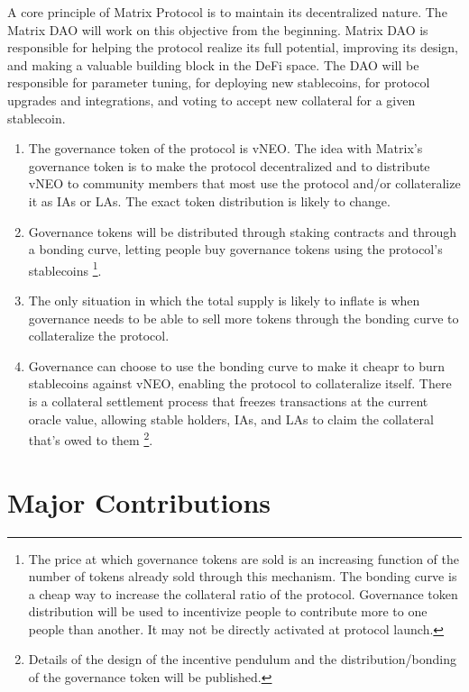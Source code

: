 \documentclass[%
 reprint,
nofootinbib,
 amsmath,amssymb,
 aps,
]{revtex4-2}
\begin{document}
A core principle of Matrix Protocol is to maintain its decentralized nature. The Matrix DAO will work on this objective from the beginning. Matrix DAO is responsible for helping the protocol realize its full potential, improving its design, and making a valuable building block in the DeFi space. The DAO will be responsible for parameter tuning, for deploying new stablecoins, for protocol upgrades and integrations, and voting to accept new collateral for a given stablecoin.

\begin{enumerate}
\item The governance token of the protocol is vNEO. The idea with Matrix’s governance token is to make the protocol decentralized and to distribute vNEO to community members that most use the protocol and/or collateralize it as IAs or LAs. The exact token distribution is likely to change. 
\item Governance tokens will be distributed through staking contracts and through a bonding curve, letting people buy governance tokens using the protocol’s stablecoins 
\footnote{The price at which governance tokens are sold is an increasing function of the number of tokens already sold through this mechanism. The bonding curve is a cheap way to increase the collateral ratio of the protocol. Governance token distribution will be used to incentivize people to contribute more to one people than another. It may not be directly activated at protocol launch.}. 

\item 
  The only situation in which the total supply is likely to inflate is when governance needs to be able to sell more tokens through the bonding curve to collateralize the protocol.
\item 
  Governance can choose to use the bonding curve to make it cheapr to burn stablecoins against vNEO, enabling the protocol to collateralize itself. There is a collateral settlement process that freezes transactions at the current oracle value, allowing stable holders, IAs, and LAs to claim the collateral that’s owed to them 
  \footnote{Details of the design of the incentive pendulum and the distribution/bonding of the governance token will be published.}.
\end{enumerate}


\section{Major Contributions}\label{Section5}
\end{document}

